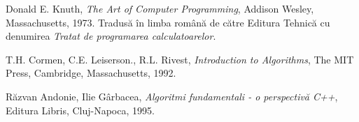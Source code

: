 
\begin{thebibliography}{9}

  Donald E. Knuth,
  {\it The Art of Computer Programming},
  Addison Wesley, Massachusetts,
  1973.
  Tradusă în limba română de către Editura Tehnică cu denumirea {\it Tratat de
    programarea calculatoarelor}.

  T.H. Cormen, C.E. Leiserson., R.L. Rivest,
  {\it Introduction to Algorithms},
  The MIT Press, Cambridge, Massachusetts,
  1992.

  Răzvan Andonie, Ilie Gârbacea,
  {\it Algoritmi fundamentali - o perspectivă C++},
  Editura Libris, Cluj-Napoca,
  1995.

\end{thebibliography}
